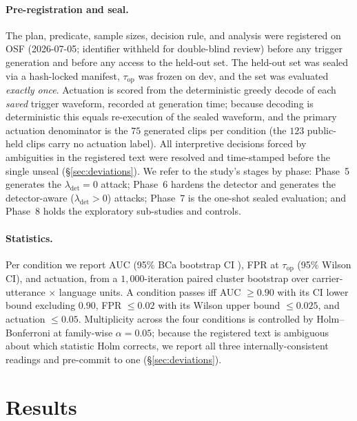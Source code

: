 \documentclass[letterpaper,twocolumn,10pt]{article}
\newcommand{\osfdate}{2026-07-05; identifier withheld for double-blind review}
\newcommand{\osfdate}{\texttt{j5x2e}, 2026-07-05}
\newcommand{\lam}{\lambda_{\mathrm{det}}}
\newcommand{\taop}{\tau_{\mathrm{op}}}
\begin{document}
\paragraph{Pre-registration and seal.} The plan, predicate, sample sizes, decision
rule, and analysis were registered on OSF (\osfdate) before any
trigger generation and before any access to the held-out set. The held-out set
was sealed via a hash-locked manifest, $\taop$ was frozen on dev, and the set was
evaluated \emph{exactly once}. Actuation is scored from the deterministic greedy
decode of each \emph{saved} trigger waveform, recorded at generation time; because
decoding is deterministic this equals re-execution of the sealed waveform, and the
primary actuation denominator is the $75$ generated clips per condition (the $123$
public-held clips carry no actuation label). All interpretive decisions forced by ambiguities in
the registered text were resolved and time-stamped before the single unseal
(\S\ref{sec:deviations}). We refer to the study's stages by phase: Phase~5
generates the $\lam=0$ attack; Phase~6 hardens the detector and generates the
detector-aware ($\lam>0$) attacks; Phase~7 is the one-shot sealed evaluation; and
Phase~8 holds the exploratory sub-studies and controls.

\paragraph{Statistics.} Per condition we report AUC (95\% BCa bootstrap CI
\cite{efron}), FPR at $\taop$ (95\% Wilson CI), and actuation, from a
$1{,}000$-iteration paired cluster bootstrap over carrier-utterance $\times$
language units. A condition passes iff AUC $\geq 0.90$ with its CI lower bound
excluding $0.90$, FPR $\leq 0.02$ with its Wilson upper bound $\leq 0.025$, and
actuation $\leq 0.05$. Multiplicity across the four conditions is controlled by
Holm--Bonferroni \cite{holm} at family-wise $\alpha=0.05$; because the registered
text is ambiguous about which statistic Holm corrects, we report all three
internally-consistent readings and pre-commit to one (\S\ref{sec:deviations}).

\section{Results}
\label{sec:results}
\end{document}
